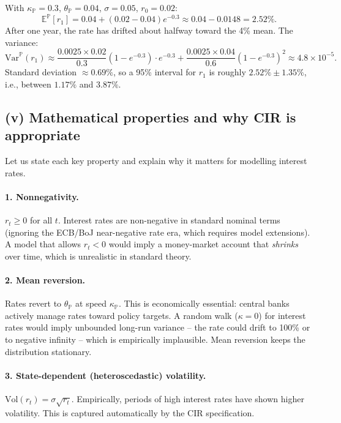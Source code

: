 \documentclass[11pt]{article}
\newcommand{\PP}{\mathbb{P}}
\newcommand{\EE}{\mathbb{E}}
\begin{document}
\begin{example_box}
With $\kappa_\PP=0.3$, $\theta_\PP=0.04$, $\sigma=0.05$, $r_0=0.02$:
\[
\EE^\PP[r_1] = 0.04 + (0.02-0.04)e^{-0.3} \approx 0.04 - 0.0148 = 2.52\%.
\]
After one year, the rate has drifted about halfway toward the 4\% mean.
The variance:
\[
\mathrm{Var}^\PP(r_1)
\approx \frac{0.0025\times 0.02}{0.3}(1-e^{-0.3})\cdot e^{-0.3}
+ \frac{0.0025\times 0.04}{0.6}(1-e^{-0.3})^2
\approx 4.8 \times 10^{-5}.
\]
Standard deviation $\approx 0.69\%$, so a 95\% interval for $r_1$ is
roughly $2.52\% \pm 1.35\%$, i.e., between $1.17\%$ and $3.87\%$.
\end{example_box}

\subsection{(v) Mathematical properties and why CIR is appropriate}

Let us state each key property and explain why it matters for modelling
interest rates.

\paragraph{1. Nonnegativity.}  $r_t \ge 0$ for all $t$.  Interest rates
are non-negative in standard nominal terms (ignoring the ECB/BoJ
near-negative rate era, which requires model extensions).  A model that
allows $r_t < 0$ would imply a money-market account that \emph{shrinks}
over time, which is unrealistic in standard theory.

\paragraph{2. Mean reversion.}  Rates revert to $\theta_\PP$ at speed
$\kappa_\PP$.  This is economically essential: central banks actively
manage rates toward policy targets.  A random walk ($\kappa=0$) for
interest rates would imply unbounded long-run variance -- the rate could
drift to 100\% or to negative infinity -- which is empirically implausible.
Mean reversion keeps the distribution stationary.

\paragraph{3. State-dependent (heteroscedastic) volatility.}
$\mathrm{Vol}(r_t) = \sigma\sqrt{r_t}$.  Empirically, periods of high
interest rates have shown higher volatility.  This is captured automatically
by the CIR specification.
\end{document}
